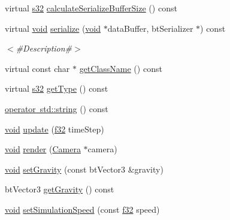\begin{DoxyCompactItemize}
\item 
virtual \mbox{\hyperlink{_util_8h_aa62c75d314a0d1f37f79c4b73b2292e2}{s32}} \mbox{\hyperlink{classnjli_1_1_physics_world_af738be88df0902fe6921d46a46bced9e}{calculate\+Serialize\+Buffer\+Size}} () const
\item 
virtual \mbox{\hyperlink{_thread_8h_af1e856da2e658414cb2456cb6f7ebc66}{void}} \mbox{\hyperlink{classnjli_1_1_physics_world_aac4422bdcfb063b92aa0a39c889e5b07}{serialize}} (\mbox{\hyperlink{_thread_8h_af1e856da2e658414cb2456cb6f7ebc66}{void}} $\ast$data\+Buffer, bt\+Serializer $\ast$) const
\begin{DoxyCompactList}\small\item\em $<$\#\+Description\#$>$ \end{DoxyCompactList}\item 
virtual const char $\ast$ \mbox{\hyperlink{classnjli_1_1_physics_world_a5966246f8f7902403e51f6b6c481ebfc}{get\+Class\+Name}} () const
\item 
virtual \mbox{\hyperlink{_util_8h_aa62c75d314a0d1f37f79c4b73b2292e2}{s32}} \mbox{\hyperlink{classnjli_1_1_physics_world_af4b51d0d7e4bf4da6b1be6525c7b7937}{get\+Type}} () const
\item 
\mbox{\hyperlink{classnjli_1_1_physics_world_a9ce27a6f2a6386f5a5e09bab5094e8c6}{operator std\+::string}} () const
\item 
\mbox{\hyperlink{_thread_8h_af1e856da2e658414cb2456cb6f7ebc66}{void}} \mbox{\hyperlink{classnjli_1_1_physics_world_a2d13fac3772ac6a2417cbdfb9ec65ed2}{update}} (\mbox{\hyperlink{_util_8h_a5f6906312a689f27d70e9d086649d3fd}{f32}} time\+Step)
\item 
\mbox{\hyperlink{_thread_8h_af1e856da2e658414cb2456cb6f7ebc66}{void}} \mbox{\hyperlink{classnjli_1_1_physics_world_ac3fe9c56c88ef269803ee550975f0a4c}{render}} (\mbox{\hyperlink{classnjli_1_1_camera}{Camera}} $\ast$camera)
\item 
\mbox{\hyperlink{_thread_8h_af1e856da2e658414cb2456cb6f7ebc66}{void}} \mbox{\hyperlink{classnjli_1_1_physics_world_a55433c9f9a854a45b2135d6e15423f8b}{set\+Gravity}} (const bt\+Vector3 \&gravity)
\item 
bt\+Vector3 \mbox{\hyperlink{classnjli_1_1_physics_world_a2ab946117c0c074c384956b9df0fed8b}{get\+Gravity}} () const
\item 
\mbox{\hyperlink{_thread_8h_af1e856da2e658414cb2456cb6f7ebc66}{void}} \mbox{\hyperlink{classnjli_1_1_physics_world_a6349b4cedb5718009109d9614e8cc8b7}{set\+Simulation\+Speed}} (const \mbox{\hyperlink{_util_8h_a5f6906312a689f27d70e9d086649d3fd}{f32}} speed)

\end{DoxyCompactItemize}
